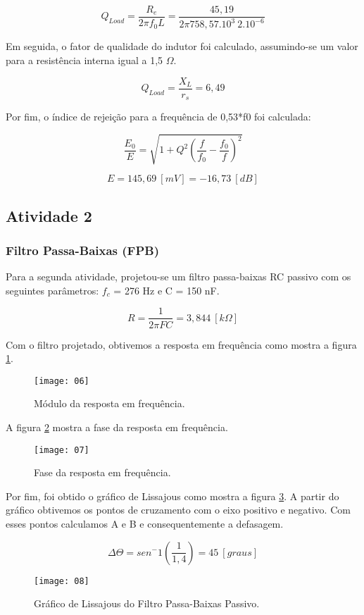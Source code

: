 \[
  Q_{Load} = \frac{R_e}{2\pi f_0L} = \frac{45,19}{2\pi  758,57.10^3 \ 2.10^{-6}}
\]

Em seguida, o fator de qualidade do indutor foi calculado, assumindo-se um valor para a resistência interna igual a 1,5 $\Omega$.

\[
  Q_{Load} = \frac{X_L}{r_s} = 6,49
\]

Por fim, o índice de rejeição para a frequência de 0,53*f0 foi calculada:

\[
  \frac{E_0}{E} = \sqrt{1 + Q^2 \left(\frac{f}{f_0} - \frac{f_0}{f}\right)^2}
\]

\[
  E = 145,69 \ [mV] = -16,73 \ [dB]
\]

\subsection{Atividade 2}

\subsubsection{Filtro Passa-Baixas (FPB)}
Para a segunda atividade, projetou-se um filtro passa-baixas RC passivo com os seguintes parâmetros: $f_c$ = 276 Hz e C = 150 nF.

\[
  R = \frac{1}{2 \pi F C} = 3,844 \ [k \Omega]
\]

Com o filtro projetado, obtivemos a resposta em frequência como mostra a figura \ref{fig:06}.

\begin{figure}[H]
  \centering
  \caption{Módulo da resposta em frequência.}
  \texttt{[image: 06]}
  
  \label{fig:06}
\end{figure}


A figura \ref{fig:07} mostra a fase da resposta em frequência.

\begin{figure}[H]
  \centering
  \caption{Fase da resposta em frequência.}
  \texttt{[image: 07]}
  
  \label{fig:07}
\end{figure}

Por fim, foi obtido o gráfico de Lissajous como mostra a figura \ref{fig:08}. A partir do gráfico obtivemos os pontos de cruzamento com o eixo positivo e negativo. Com esses pontos calculamos A e B e consequentemente a defasagem.

\[
  \Delta \Theta = sen^-1 \left(\frac{1}{1,4}\right) = 45 \ [graus]
\]
\begin{figure}[H]
  \centering
  \caption{Gráfico de Lissajous do Filtro Passa-Baixas Passivo.}
  \texttt{[image: 08]}
  
  \label{fig:08}
\end{figure}

